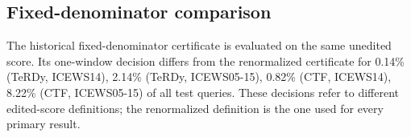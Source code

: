 \subsection{Fixed-denominator comparison}
The historical fixed-denominator certificate is evaluated on the same unedited score. Its one-window decision differs from the renormalized certificate for 0.14\% (TeRDy, ICEWS14), 2.14\% (TeRDy, ICEWS05-15), 0.82\% (CTF, ICEWS14), 8.22\% (CTF, ICEWS05-15) of all test queries. These decisions refer to different edited-score definitions; the renormalized definition is the one used for every primary result.